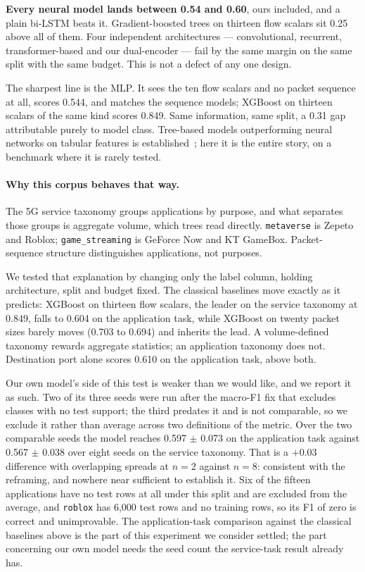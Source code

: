 

\textbf{Every neural model lands between 0.54 and 0.60}, ours included, and a
plain bi-LSTM beats it. Gradient-boosted trees on thirteen flow scalars sit
0.25 above all of them. Four independent architectures --- convolutional,
recurrent, transformer-based and our dual-encoder --- fail by the same margin
on the same split with the same budget. This is not a defect of any one design.

The sharpest line is the MLP. It sees the ten flow scalars and no packet
sequence at all, scores 0.544, and matches the sequence models; XGBoost on
thirteen scalars of the same kind scores 0.849. Same information, same split, a
0.31 gap attributable purely to model class. Tree-based models outperforming
neural networks on tabular features is
established~\cite{grinsztajn2022trees}; here it is the entire story, on a
benchmark where it is rarely tested.

\paragraph{Why this corpus behaves that way.} The 5G service taxonomy groups
applications by purpose, and what separates those groups is aggregate volume,
which trees read directly. \texttt{metaverse} is Zepeto and Roblox;
\texttt{game\_streaming} is GeForce Now and KT GameBox. Packet-sequence
structure distinguishes applications, not purposes.

We tested that explanation by changing only the label column, holding
architecture, split and budget fixed. The classical baselines move exactly as
it predicts: XGBoost on thirteen flow scalars, the leader on the service
taxonomy at 0.849, falls to 0.604 on the application task, while XGBoost on
twenty packet sizes barely moves (0.703 to 0.694) and inherits the lead. A
volume-defined taxonomy rewards aggregate statistics; an application taxonomy
does not. Destination port alone scores 0.610 on the application task, above
both.

Our own model's side of this test is weaker than we would like, and we report
it as such. Two of its three seeds were run after the macro-F1 fix that
excludes classes with no test support; the third predates it and is not
comparable, so we exclude it rather than average across two definitions of the
metric. Over the two comparable seeds the model reaches 0.597 $\pm$ 0.073 on
the application task against 0.567 $\pm$ 0.038 over eight seeds on the service
taxonomy. That is a $+0.03$ difference with overlapping spreads at $n=2$
against $n=8$: consistent with the reframing, and nowhere near sufficient to
establish it. Six of the fifteen applications have no test rows at all under
this split and are excluded from the average, and \texttt{roblox} has 6{,}000
test rows and no training rows, so its F1 of zero is correct and unimprovable.
The application-task comparison against the classical baselines above is the
part of this experiment we consider settled; the part concerning our own model
needs the seed count the service-task result already has.


